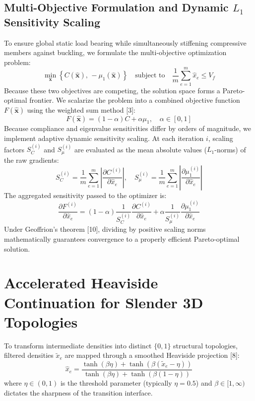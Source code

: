 \documentclass[11pt, a4paper]{article}
\begin{document}
\subsection{Multi-Objective Formulation and Dynamic \texorpdfstring{$L_1$}{L1} Sensitivity Scaling}
To ensure global static load bearing while simultaneously stiffening compressive members against buckling, we formulate the multi-objective optimization problem:
\begin{equation}
\min_{\mathbf{x}} \left\{ C(\hat{\mathbf{x}}), \, -\mu_1(\hat{\mathbf{x}}) \right\} \quad \text{subject to} \quad \frac{1}{m}\sum_{e=1}^m \hat{x}_e \le V_f
\label{eq:multiobj_prob}
\end{equation}
Because these two objectives are competing, the solution space forms a Pareto-optimal frontier. We scalarize the problem into a combined objective function $F(\hat{\mathbf{x}})$ using the weighted sum method [3]:
\begin{equation}
F(\hat{\mathbf{x}}) = (1 - \alpha) C + \alpha \mu_1, \quad \alpha \in [0, 1]
\label{eq:scalarized_obj}
\end{equation}
Because compliance and eigenvalue sensitivities differ by orders of magnitude, we implement adaptive dynamic sensitivity scaling. At each iteration $i$, scaling factors $S_C^{(i)}$ and $S_\mu^{(i)}$ are evaluated as the mean absolute values ($L_1$-norms) of the raw gradients:
\begin{equation}
S_C^{(i)} = \frac{1}{m}\sum_{e=1}^m \left| \frac{\partial C^{(i)}}{\partial \hat{x}_e} \right|, \quad 
S_\mu^{(i)} = \frac{1}{m}\sum_{e=1}^m \left| \frac{\partial \mu_1^{(i)}}{\partial \hat{x}_e} \right|
\end{equation}
The aggregated sensitivity passed to the optimizer is:
\begin{equation}
\frac{\partial F^{(i)}}{\partial \hat{x}_e} = (1 - \alpha) \frac{1}{S_C^{(i)}} \frac{\partial C^{(i)}}{\partial \hat{x}_e} + \alpha \frac{1}{S_\mu^{(i)}} \frac{\partial \mu_1^{(i)}}{\partial \hat{x}_e}
\end{equation}
Under Geoffrion's theorem [10], dividing by positive scaling norms mathematically guarantees convergence to a properly efficient Pareto-optimal solution.

\section{Accelerated Heaviside Continuation for Slender 3D Topologies}
To transform intermediate densities into distinct $\{0, 1\}$ structural topologies, filtered densities $\tilde{x}_e$ are mapped through a smoothed Heaviside projection [8]:
\begin{equation}
\hat{x}_e = \frac{\tanh(\beta \eta) + \tanh(\beta (\tilde{x}_e - \eta))}{\tanh(\beta \eta) + \tanh(\beta (1 - \eta))}
\end{equation}
where $\eta \in (0, 1)$ is the threshold parameter (typically $\eta = 0.5$) and $\beta \in [1, \infty)$ dictates the sharpness of the transition interface.
\end{document}
